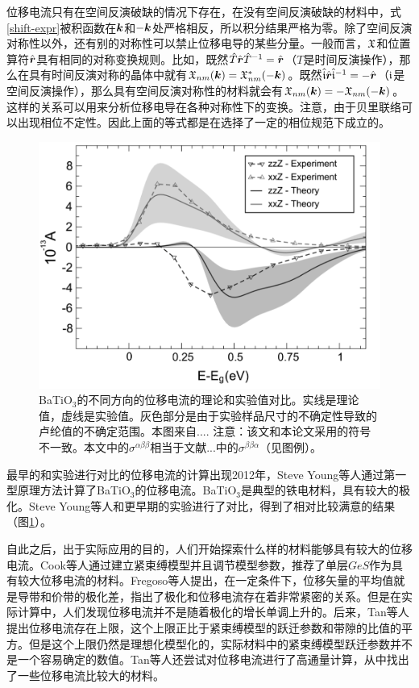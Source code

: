位移电流只有在空间反演破缺的情况下存在，在没有空间反演破缺的材料中，式\ref{shift-expr}被积函数在$\boldsymbol{k}$和$-\boldsymbol{k}$处严格相反，所以积分结果严格为零。除了空间反演对称性以外，还有别的对称性可以禁止位移电导的某些分量。一般而言，$\mathfrak{X}$和位置算符$\hat{\boldsymbol{r}}$具有相同的对称变换规则。比如，既然$\hat{T}\hat{\boldsymbol{r}}\hat{T}^{-1}=\hat{\boldsymbol{r}}$（$T$是时间反演操作），那么在具有时间反演对称的晶体中就有$\mathfrak{X}_{nm}(\boldsymbol{k})=\mathfrak{X}_{nm}^*(-\boldsymbol{k})$。既然$\hat{\mathfrak{i}} \hat{\boldsymbol{r}} \hat{\mathfrak{i}}^{-1}=-\hat{\boldsymbol{r}}$（$\mathfrak{i}$是空间反演操作），那么具有空间反演对称性的材料就会有$\mathfrak{X}_{nm}(\boldsymbol{k})=-\mathfrak{X}_{nm}(-\boldsymbol{k})$。这样的关系可以用来分析位移电导在各种对称性下的变换。注意，由于贝里联络可以出现相位不定性。因此上面的等式都是在选择了一定的相位规范下成立的。

\begin{figure}
\includegraphics[width=1.0\textwidth]{data/young-shift.png}
\caption{BaTiO$_3$的不同方向的位移电流的理论和实验值对比。实线是理论值，虚线是实验值。灰色部分是由于实验样品尺寸的不确定性导致的卢纶值的不确定范围。本图来自.... 注意：该文和本论文采用的符号不一致。本文中的$\sigma^{\alpha\beta\beta}$相当于文献...中的$\sigma^{\beta\beta\alpha}$（见图例）。\label{young-shift}}
\end{figure}

最早的和实验进行对比的位移电流的计算出现2012年，Steve Young等人通过第一型原理方法计算了BaTiO$_3$的位移电流。BaTiO$_3$是典型的铁电材料，具有较大的极化。Steve Young等人和更早期的实验进行了对比，得到了相对比较满意的结果（图\ref{young-shift}）。

自此之后，出于实际应用的目的，人们开始探索什么样的材料能够具有较大的位移电流。Cook等人通过建立紧束缚模型并且调节模型参数，推荐了单层$GeS$作为具有较大位移电流的材料。Fregoso等人提出，在一定条件下，位移矢量的平均值就是导带和价带的极化差，指出了极化和位移电流存在着非常紧密的关系。但是在实际计算中，人们发现位移电流并不是随着极化的增长单调上升的。后来，Tan等人提出位移电流存在上限，这个上限正比于紧束缚模型的跃迁参数和带隙的比值的平方。但是这个上限仍然是理想化模型化的，实际材料中的紧束缚模型跃迁参数并不是一个容易确定的数值。Tan等人还尝试对位移电流进行了高通量计算，从中找出了一些位移电流比较大的材料。


